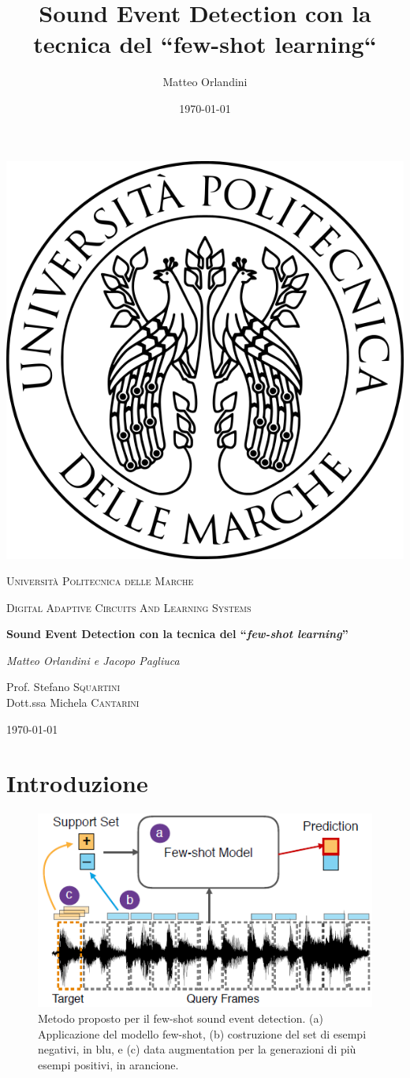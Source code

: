 \documentclass[12pt,a4paper,titlepage]{article}
\title{Sound Event Detection con la tecnica del “few-shot learning“}
\author{Matteo Orlandini}
\date{\today}
\begin{document}
\begin{titlepage}
	
	\centering
	\includegraphics[width=.2\textwidth]{Immagini/univpmlogo}\par\vspace{1cm}
	{\scshape\LARGE Università Politecnica delle Marche\par}
	\vspace{1cm}
	{\scshape\Large Digital Adaptive Circuits And Learning Systems\par}
	\vspace{1.5cm}
	{\huge\bfseries Sound Event Detection con la tecnica del  ``\emph{few-shot learning}''  \par}
	\vspace{2cm}
	{\Large\itshape Matteo Orlandini e Jacopo Pagliuca\par}
	\vfill
	Prof. Stefano \textsc{Squartini}\\
	Dott.ssa Michela \textsc{Cantarini}
	
	\vfill
	
	{\large \today\par}
\end{titlepage}

\thispagestyle{empty}
\tableofcontents
\clearpage

\setcounter{page}{1}

\section{Introduzione}
\label{section:Introduzione}
\begin{figure}[h]
	\centering	
	\includegraphics[width=.5\textwidth]{Immagini/few_shot_sound_event_detection_method}
	\caption{Metodo proposto per il few-shot sound event detection. (a) Applicazione del modello few-shot, (b) costruzione del set di esempi negativi, in blu, e (c) data augmentation per la generazioni di più esempi positivi, in arancione.~\cite{Salamon:Few-Shot}}
	\label{fig:few_shot_sound_event_detection_method}
\end{figure}
\end{document}
